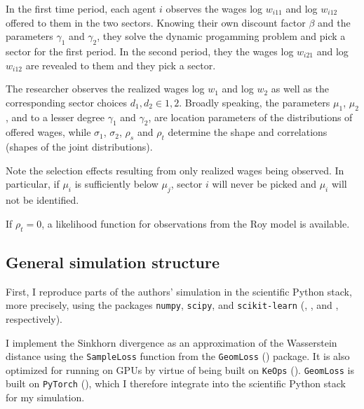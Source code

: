 In the first time period, each agent $i$ observes the wages log $w_{i11}$ and log $w_{i12}$ offered to them in the two sectors.
Knowing their own discount factor $\beta$ and the parameters $\gamma_1$ and $\gamma_2$, they solve the dynamic progamming problem
and pick a sector for the first period.
In the second period, they the wages log $w_{i21}$ and log $w_{i12}$ are revealed to them and they pick a sector. %

The researcher observes the realized wages log $w_1$ and log $w_2$ as well as the corresponding sector choices $d_1, d_2 \in {1, 2}$.
Broadly speaking, the parameters $\mu_1$, $\mu_2$, and to a lesser degree $\gamma_1$ and $\gamma_2$, are location parameters of the distributions of offered wages,
while $\sigma_1$, $\sigma_2$, $\rho_s$ and $\rho_t$ determine the shape and correlations (shapes of the joint distributions). %

Note the selection effects resulting from only realized wages being observed.
In particular, if $\mu_i$ is sufficiently below $\mu_j$, sector $i$ will never be picked and $\mu_i$ will not be identified.

If $\rho_t = 0$, a likelihood function for observations from the Roy model is available.

\subsection{General simulation structure}
\label{sec:general_simulation_structure}

First, I reproduce parts of the authors' simulation in the scientific Python stack, more precisely, using the packages \texttt{numpy}, \texttt{scipy}, and \texttt{scikit-learn} (\textcite{harris2020array}, \textcite{2020SciPy-NMeth}, and \textcite{scikit-learn}, respectively).

I implement the Sinkhorn divergence as an approximation of the Wasserstein distance using the \texttt{SampleLoss} function from the \texttt{GeomLoss} (\cite{feydy2019interpolating}) package.
It is also optimized for running on GPUs by virtue of being built on \texttt{KeOps} (\cite{KeOps}).
\texttt{GeomLoss} is built on \texttt{PyTorch} (\cite{Ansel_PyTorch_2_Faster_2024}), which I therefore integrate into the scientific Python stack for my simulation.

